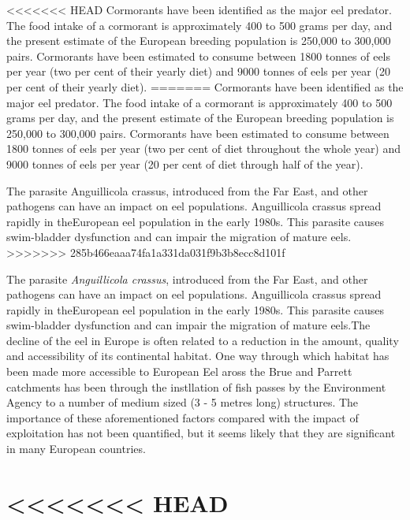 \documentclass[]{article}
\begin{document}
\textless{}\textless{}\textless{}\textless{}\textless{}\textless{}\textless{}
HEAD Cormorants have been identified as the major eel predator. The food
intake of a cormorant is approximately 400 to 500 grams per day, and the
present estimate of the European breeding population is 250,000 to
300,000 pairs. Cormorants have been estimated to consume between 1800
tonnes of eels per year (two per cent of their yearly diet) and 9000
tonnes of eels per year (20 per cent of their yearly diet). =======
Cormorants have been identified as the major eel predator. The food
intake of a cormorant is approximately 400 to 500 grams per day, and the
present estimate of the European breeding population is 250,000 to
300,000 pairs. Cormorants have been estimated to consume between 1800
tonnes of eels per year (two per cent of diet throughout the whole year)
and 9000 tonnes of eels per year (20 per cent of diet through half of
the year).

The parasite Anguillicola crassus, introduced from the Far East, and
other pathogens can have an impact on eel populations. Anguillicola
crassus spread rapidly in theEuropean eel population in the early 1980s.
This parasite causes swim-bladder dysfunction and can impair the
migration of mature eels.
\textgreater{}\textgreater{}\textgreater{}\textgreater{}\textgreater{}\textgreater{}\textgreater{}
285b466eaaa74fa1a331da031f9b3b8ecc8d101f

The parasite \emph{Anguillicola crassus}, introduced from the Far East,
and other pathogens can have an impact on eel populations. Anguillicola
crassus spread rapidly in theEuropean eel population in the early 1980s.
This parasite causes swim-bladder dysfunction and can impair the
migration of mature eels.The decline of the eel in Europe is often
related to a reduction in the amount, quality and accessibility of its
continental habitat. One way through which habitat has been made more
accessible to European Eel aross the Brue and Parrett catchments has
been through the instllation of fish passes by the Environment Agency to
a number of medium sized (3 - 5 metres long) structures. The importance
of these aforementioned factors compared with the impact of exploitation
has not been quantified, but it seems likely that they are significant
in many European countries.

\hypertarget{head}{%
\section{\textless{}\textless{}\textless{}\textless{}\textless{}\textless{}\textless{}
HEAD}\label{head}}
\end{document}
